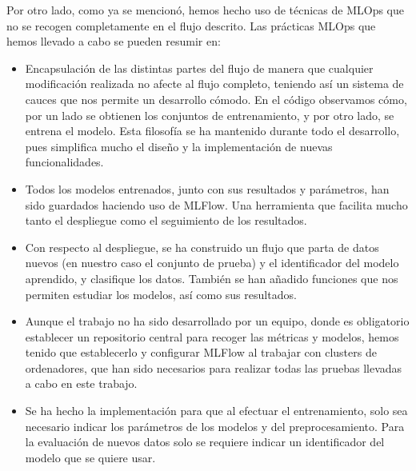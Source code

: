 \documentclass[a4paper,12pt,oneside,titlepage]{book}
\begin{document}
Por otro lado, como ya se mencionó, hemos hecho uso de técnicas de MLOps que no se recogen completamente en el flujo descrito. Las prácticas MLOps que hemos llevado a cabo se pueden resumir en:
\begin{itemize}
  \item Encapsulación de las distintas partes del flujo de manera que cualquier modificación realizada no afecte al flujo completo, teniendo así un sistema de cauces que nos permite un desarrollo cómodo. En el código observamos cómo, por un lado se obtienen los conjuntos de entrenamiento, y por otro lado, se entrena el modelo. Esta filosofía se ha mantenido durante todo el desarrollo, pues simplifica mucho el diseño y la implementación de nuevas funcionalidades. 
  \item Todos los modelos entrenados, junto con sus resultados y parámetros, han sido guardados haciendo uso de MLFlow. Una herramienta que facilita mucho tanto el despliegue como el seguimiento de los resultados.
  \item Con respecto al despliegue, se ha construido un flujo que parta de datos nuevos (en nuestro caso el conjunto de prueba) y el identificador del modelo aprendido, y clasifique los datos. También se han añadido funciones que nos permiten estudiar los modelos, así como sus resultados.
  \item Aunque el trabajo no ha sido desarrollado por un equipo, donde es obligatorio establecer un repositorio central para recoger las métricas y modelos, hemos tenido que establecerlo y configurar MLFlow al trabajar con clusters de ordenadores, que han sido necesarios para realizar todas las pruebas llevadas a cabo en este trabajo.
  \item Se ha hecho la implementación para que al efectuar el entrenamiento, solo sea necesario indicar los parámetros de los modelos y del preprocesamiento. Para la evaluación de nuevos datos solo se requiere indicar un identificador del modelo que se quiere usar.
\end{itemize} 
\end{document}
